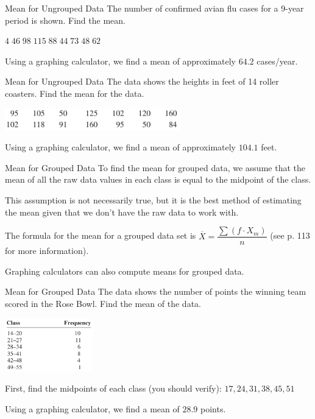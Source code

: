 \documentclass[t, aspectratio=169]{beamer}
\newcommand{\?}{\stackrel{?}{=}}
\begin{document}
	\begin{frame}{Mean for Ungrouped Data}
		The number of confirmed avian flu cases for a 9-year period is shown. Find the mean.
		
		$4 \; 46 \; 98 \; 115 \; 88 \; 44 \; 73 \; 48 \; 62$ \pause \vspace{32pt}
		
		Using a graphing calculator, we find a mean of approximately $64.2$ cases/year.
	\end{frame}

	\begin{frame}{Mean for Ungrouped Data}
		The data shows the heights in feet of 14 roller coasters. Find the mean for the data.
		
		\includegraphics[width=3in]{coaster-data.png} \pause \vspace{32pt}
		
		Using a graphing calculator, we find a mean of approximately $104.1$ feet.
	\end{frame}

	\begin{frame}{Mean for Grouped Data}
		To find the mean for grouped data, we assume that the mean of all the raw data values in each class is equal to the midpoint of the class. \pause
		
		This assumption is not necessarily true, but it is the best method of estimating the mean given that we don't have the raw data to work with. \pause
		
		The formula for the mean for a grouped data set is $\overline{X} = \dfrac{\sum (f \cdot X_m)}{n}$ (see p. 113 for more information).
		
		Graphing calculators can also compute means for grouped data.
	\end{frame}

	\begin{frame}{Mean for Grouped Data}
		The data shows the number of points the winning team scored in the Rose Bowl. Find the mean of the data. \pause
		
		\includegraphics[width=1.5in]{rose-data.png} \pause
		
		First, find the midpoints of each class (you should verify): $17, 24, 31, 38, 45, 51$ \pause \vspace{32pt}
		
		Using a graphing calculator, we find a mean of $28.9$ points.
	\end{frame}
\end{document}
